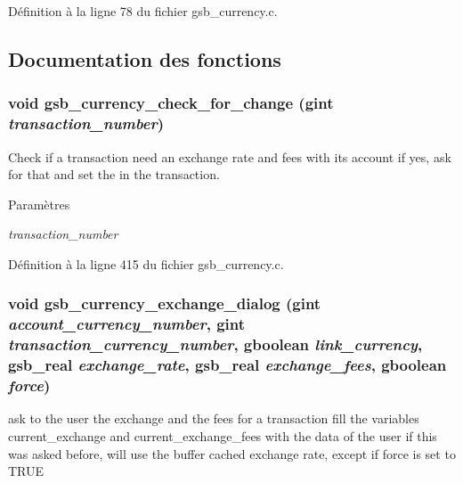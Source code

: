 Définition à la ligne 78 du fichier gsb\_\-currency.c.



\subsection{Documentation des fonctions}
\subsubsection[{gsb\_\-currency\_\-check\_\-for\_\-change}]{\setlength{\rightskip}{0pt plus 5cm}void gsb\_\-currency\_\-check\_\-for\_\-change (gint {\em transaction\_\-number})}\label{gsb__currency_8c_aad743bb08129ef82240ca9ecc743b4dc}
Check if a transaction need an exchange rate and fees with its account if yes, ask for that and set the in the transaction.


\begin{DoxyParams}{Paramètres}
\item[{\em transaction\_\-number}]\end{DoxyParams}


Définition à la ligne 415 du fichier gsb\_\-currency.c.

\subsubsection[{gsb\_\-currency\_\-exchange\_\-dialog}]{\setlength{\rightskip}{0pt plus 5cm}void gsb\_\-currency\_\-exchange\_\-dialog (gint {\em account\_\-currency\_\-number}, \/  gint {\em transaction\_\-currency\_\-number}, \/  gboolean {\em link\_\-currency}, \/  {\bf gsb\_\-real} {\em exchange\_\-rate}, \/  {\bf gsb\_\-real} {\em exchange\_\-fees}, \/  gboolean {\em force})}\label{gsb__currency_8c_a729f791b99a98165dcd022823e0613c4}
ask to the user the exchange and the fees for a transaction fill the variables current\_\-exchange and current\_\-exchange\_\-fees with the data of the user if this was asked before, will use the buffer cached exchange rate, except if force is set to TRUE


